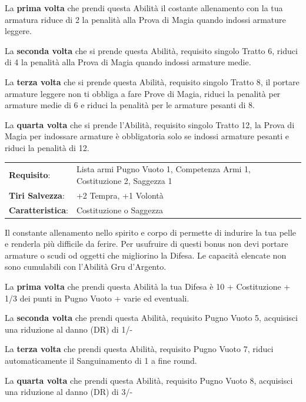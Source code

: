 \begin{multicols}{2}
La \textbf{prima volta} che prendi questa Abilità il costante allenamento con la tua armatura riduce di 2 la penalità alla Prova di Magia quando indossi armature leggere.

La \textbf{seconda volta} che si prende questa Abilità, requisito singolo Tratto 6, riduci di 4 la penalità alla Prova di Magia quando indossi armature medie.

La \textbf{terza volta} che si prende questa Abilità, requisito singolo Tratto 8, il portare armature leggere non ti obbliga a fare Prove di Magia, riduci la penalità per armature medie di 6 e riduci la penalità per le armature pesanti di 8.

La \textbf{quarta volta} che si prende l'Abilità, requisito singolo Tratto 12, la Prova di Magia per indossare armature è obbligatoria solo se indossi armature pesanti e riduci la penalità di 12.

\hspace{-0.2cm}\begin{tabularx}{\linewidth}{l@{\hspace{8pt}}X}
\rowcolor{gray!20}\textbf{Requisito}: & Lista armi Pugno Vuoto 1, Competenza Armi 1, Costituzione 2, Saggezza 1\\
\textbf{Tiri Salvezza}: & +2 Tempra, +1 Volontà\\
\rowcolor{gray!20}\textbf{Caratteristica}: & Costituzione o Saggezza\\
\end{tabularx}\smallskip

Il constante allenamento nello spirito e corpo di permette di indurire la tua pelle e renderla più difficile da ferire. Per usufruire di questi bonus non devi portare armature o scudi od oggetti che migliorino la Difesa. Le capacità elencate non sono cumulabili con l'Abilità Gru d'Argento.

La \textbf{prima volta} che prendi questa Abilità la tua Difesa è 10 + Costituzione + 1/3 dei punti in Pugno Vuoto + varie ed eventuali.

La \textbf{seconda volta} che prendi questa Abilità, requisito Pugno Vuoto 5, acquisisci una riduzione al danno (DR) di 1/-

La \textbf{terza volta} che prendi questa Abilità, requisito Pugno Vuoto 7, riduci automaticamente il Sanguinamento di 1 a fine round.

La \textbf{quarta volta} che prendi questa Abilità, requisito Pugno Vuoto 8, acquisisci una riduzione al danno (DR) di 3/-


\end{multicols}
